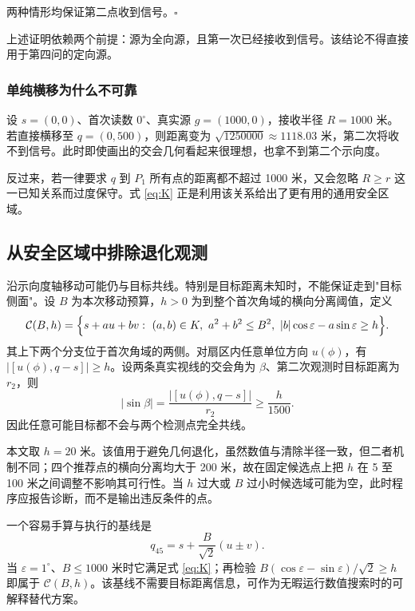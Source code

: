 两种情形均保证第二点收到信号。$\square$

上述证明依赖两个前提：源为全向源，且第一次已经接收到信号。该结论不得直接用于第四问的定向源。

\subsubsection{单纯横移为什么不可靠}

设 $s=(0,0)$、首次读数 $0^\circ$、真实源 $g=(1000,0)$，接收半径 $R=1000$ 米。若直接横移至 $q=(0,500)$，则距离变为 $\sqrt{1250000}\approx1118.03$ 米，第二次将收不到信号。此时即使画出的交会几何看起来很理想，也拿不到第二个示向度。

反过来，若一律要求 $q$ 到 $P_1$ 所有点的距离都不超过 1000 米，又会忽略 $R\ge r$ 这一已知关系而过度保守。式 \eqref{eq:K} 正是利用该关系给出了更有用的通用安全区域。

\subsection{从安全区域中排除退化观测}

沿示向度轴移动可能仍与目标共线。特别是目标距离未知时，不能保证走到"目标侧面"。设 $B$ 为本次移动预算，$h>0$ 为到整个首次角域的横向分离阈值，定义
\begin{equation}
  \mathcal{C}(B,h)=\Bigl\{s+au+bv:\ (a,b)\in K,\ a^2+b^2\le B^2,\ \lvert b\rvert\cos\varepsilon-a\sin\varepsilon\ge h\Bigr\}.
  \label{eq:C-Bh}
\end{equation}
其上下两个分支位于首次角域的两侧。对扇区内任意单位方向 $u(\phi)$，有 $\lvert[u(\phi),q-s]\rvert\ge h$。设两条真实视线的交会角为 $\beta$、第二次观测时目标距离为 $r_2$，则
\begin{equation}
  \lvert\sin\beta\rvert=\frac{\lvert[u(\phi),q-s]\rvert}{r_2}\ge\frac{h}{1500}.
  \label{eq:sin-beta}
\end{equation}
因此任意可能目标都不会与两个检测点完全共线。

本文取 $h=20$ 米。该值用于避免几何退化，虽然数值与清除半径一致，但二者机制不同；四个推荐点的横向分离均大于 200 米，故在固定候选点上把 $h$ 在 5 至 100 米之间调整不影响其可行性。当 $h$ 过大或 $B$ 过小时候选域可能为空，此时程序应报告诊断，而不是输出违反条件的点。

一个容易手算与执行的基线是
\begin{equation}
  q_{45}=s+\frac{B}{\sqrt2}(u\pm v).
  \label{eq:q45}
\end{equation}
当 $\varepsilon=1^\circ$、$B\le1000$ 米时它满足式 \eqref{eq:K}；再检验 $B(\cos\varepsilon-\sin\varepsilon)/\sqrt2\ge h$ 即属于 $\mathcal{C}(B,h)$。该基线不需要目标距离信息，可作为无暇运行数值搜索时的可解释替代方案。

